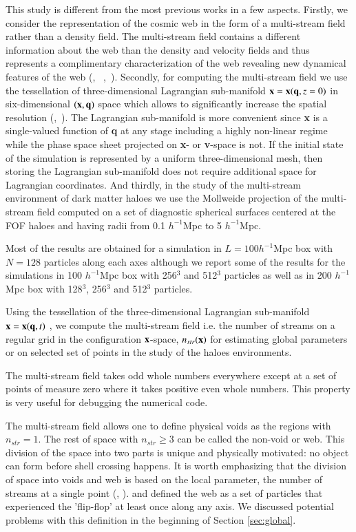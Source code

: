 This study is different from the most previous works in a few aspects.
Firstly, we consider the representation of the cosmic web in the form of  a multi-stream field rather  than a density field.
The multi-stream field contains a different information about the web than the density and velocity fields and thus represents 
a complimentary characterization of the web revealing new dynamical features of the web 
(\citealt{Shandarin2011}, ~\citealt{Shandarin2012},~\citealt{Abel2012}).  Secondly, for computing the multi-stream field we use 
the tessellation of three-dimensional Lagrangian sub-manifold ${\bf x} = {\bf x}({\bf q}, z=0)$ in six-dimensional $({\bf x},{\bf q})$ space
which allows to significantly increase the spatial resolution (\citealt{Shandarin2012},~\citealt{Abel2012}). The Lagrangian sub-manifold is more convenient since
{\bf x}  is a single-valued function of {\bf q} at any stage including a highly non-linear regime while 
the phase space sheet projected on  {\bf x}- or {\bf v}-space is not. If the initial state of the simulation is represented by a uniform three-dimensional mesh, then storing the Lagrangian sub-manifold does not require additional space for Lagrangian coordinates. And thirdly, in the study of the multi-stream environment of dark matter haloes we use the Mollweide projection of the multi-stream field 
computed on a set of diagnostic spherical surfaces centered at the FOF haloes and  having radii from 0.1 $h^{-1}$Mpc to 5 $h^{-1}$Mpc.

Most of the results are obtained for a simulation in $L=100  h^{-1}$Mpc box with $N = 128$  particles along each axes although we report
some of the results for the simulations in 100  $h^{-1}$Mpc box with 256$^3$ and 512$^3$ particles as well as  in 200  $h^{-1}$Mpc
box with 128$^3$, 256$^3$  and 512$^3$ particles.

Using the tessellation of the three-dimensional Lagrangian sub-manifold 
${\bf x} = {\bf x} ({\bf q},t)$  \citep{Shandarin2012}, we compute the multi-stream field i.e. 
the number of streams  on a regular grid in the configuration ${\bf x}$-space, $n_{str}({\bf x})$ for
estimating global parameters or on selected set of points in the study of the haloes environments.

The multi-stream field takes odd whole numbers everywhere except at a set of points of measure zero where it takes positive even whole numbers.
This property is very useful for debugging the numerical code.

 The multi-stream field allows one to define physical voids as the regions with $n_{str} =1$. 
 The rest of space with $n_{str} \ge 3$ can be called the non-void or web.
This division of the space into two parts is unique and physically motivated: no object can form before shell crossing happens. 
It is worth emphasizing that the division of space into voids and web is based on the local parameter, the number of streams at a single point (\citealt{Shandarin2012}, \citealt{Abel2012}). \citet{Falck2012} and \citet{Falck2015} defined the web as a set of particles that experienced the 'flip-flop' at least once along any axis. We discussed potential problems with this definition in the beginning of Section \ref{sec:global}.





